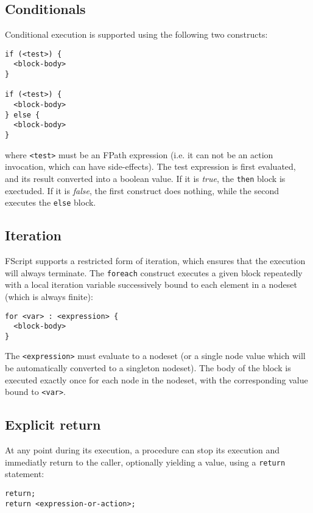 \documentclass[a4paper,12pt]{report}
\begin{document}
\subsection{Conditionals}
\label{sec:conditionals}

Conditional execution is supported using the following two constructs:
\begin{verbatim}
if (<test>) {
  <block-body>
}

if (<test>) {
  <block-body>
} else {
  <block-body>
}
\end{verbatim}
where \verb+<test>+ must be an FPath expression (i.e. it can not be an action invocation,
which can have side-effects). The test expression is first evaluated, and its result
converted into a boolean value. If it is \emph{true}, the \texttt{then} block is
exectuded. If it is \emph{false}, the first construct does nothing, while the second
executes the \texttt{else} block.

\subsection{Iteration}
\label{sec:iteration}

FScript supports a restricted form of iteration, which ensures that the execution will
always terminate. The \texttt{foreach} construct executes a given block repeatedly with a
local iteration variable successively bound to each element in a nodeset (which is always
finite):

\begin{verbatim}
for <var> : <expression> {
  <block-body>
}
\end{verbatim}

The \texttt{<expression>} must evaluate to a nodeset (or a single node value which will be
automatically converted to a singleton nodeset). The body of the block is executed exactly
once for each node in the nodeset, with the corresponding value bound to \texttt{<var>}.

\subsection{Explicit return}
\label{sec:explicit-return}

At any point during its execution, a procedure can stop its execution and immediatly
return to the caller, optionally yielding a value, using a \texttt{return} statement:

\begin{verbatim}
return;
return <expression-or-action>;
\end{verbatim}
\end{document}
